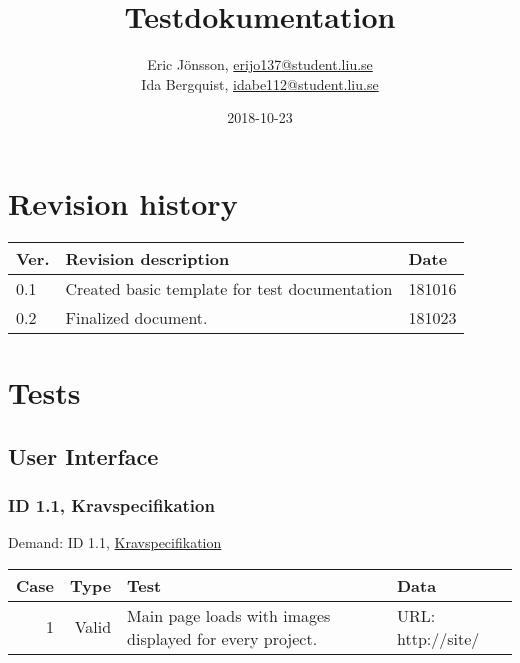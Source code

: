 \documentclass{TDP003mall}
\author{Eric Jönsson, \url{erijo137@student.liu.se}\\
  Ida Bergquist, \url{idabe112@student.liu.se}}
\title{Testdokumentation}
\date{2018-10-23}
\begin{document}
\projectpage
\tableofcontents
\newpage
\section{Revision history}
\begin{table}[!h]
\begin{tabularx}{\linewidth}{|l|X|l|}
\hline
\textbf{Ver.} & \textbf{Revision description} & \textbf{Date} \\\hline
0.1 & Created basic template for test documentation & 181016 \\\hline
0.2 & Finalized document. & 181023 \\\hline
\end{tabularx}
\end{table}


\section{Tests}
\subsection{User Interface}
\subsubsection{ID 1.1, Kravspecifikation}
Demand: ID 1.1, \href{https://www.ida.liu.se/~TDP003/current/projekt/dokument/systemspecifikation.pdf}{Kravspecifikation}

\begin{table}[!h]
\begin{tabularx}{\linewidth}{|r|r|X|X|}\hline
\textbf{Case} & \textbf{Type} & \textbf{Test} & \textbf{Data} \\\hline
1 & Valid & Main page loads with images displayed for every project. & URL: http://site/ \\\hline
\end{tabularx}
\end{table}
\end{document}
